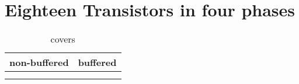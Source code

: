 \section{Eighteen Transistors in four phases}

\begin{table}[ht]
\centering
\caption*{covers}

\begin{tabular}{cc}
    \toprule
    non-buffered & buffered \\
    \midrule

    \nameref{cell:AAOOAAOI2223} & \nameref{cell:AAOOAAO2223} \\
    \nameref{cell:OOAAOOAI2223} & \nameref{cell:OOAAOOA2223}

\end{tabular}

\end{table}

 
 
